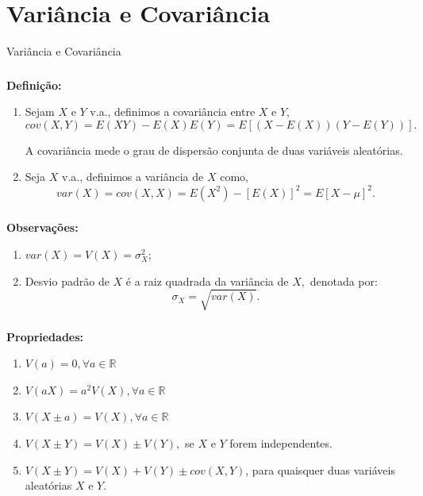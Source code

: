 \documentclass[14pt,aspectratio=1610]{beamer}
\begin{document}
\section{Variância e Covariância}
\begin{frame}{Variância e Covariância}
\frametitle{}
\begin{block}{}
\justifying
\textbf{Definição:} 
\begin{enumerate}
\item Sejam $X$ e $Y$ v.a., definimos a covariância entre $X$ e $Y,$ $$cov(X,Y)=E(XY)-E(X)E(Y)=E[(X-E(X))(Y-E(Y))].$$

A covariância mede o grau de dispersão conjunta de duas variáveis aleatórias.\pause

\item Seja $X$ v.a., definimos a variância de $X$ como, $$var(X)=cov(X,X)=E(X^{2})-[E(X)]^{2}=E[X-\mu]^{2}.$$

\end{enumerate}

\end{block}
\end{frame}

\begin{frame}{}
\frametitle{}
\begin{block}{}
\justifying
\textbf{Observações:} 
\begin{enumerate}
\item $var(X)=V(X)=\sigma_{X}^{2};$\pause

\item Desvio padrão de $X$ é a raiz quadrada da variância de $X,$ denotada por: $$\sigma_{X}=\sqrt{var(X)}.$$

\end{enumerate}

\end{block}
\end{frame}

\begin{frame}{}
\frametitle{}
\begin{block}{}
\justifying
\textbf{Propriedades:}

\begin{enumerate}
\item $V(a)=0,\forall a\in \mathbb{R}$\pause
\item $V(aX)=a^{2}V(X),\forall a\in \mathbb{R}$\pause
\item $V(X\pm a)=V(X), \forall a\in \mathbb{R}$\pause
\item $V(X\pm Y)=V(X) \pm V(Y),$ se $X$ e $Y$ forem independentes.\pause
\item $V(X\pm Y)=V(X) + V(Y) \pm cov(X,Y)$, para quaisquer duas variáveis aleatórias $X$ e $Y.$
\end{enumerate}
\end{block}
\end{frame}
\end{document}
